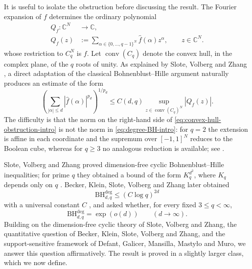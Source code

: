 \documentclass[11pt,a4paper]{article}
\numberwithin{equation}{section}
\theoremstyle{cleanplain}
\theoremstyle{cleandefinition}
\theoremstyle{cleanremark}
\newcommand{\C}{\mathbb C}
\newcommand{\BHdeg}[2]{\mathrm{BH}^{\mathrm{deg}}_{#1,#2}}
\begin{document}
It is useful to isolate the obstruction before discussing the result.  The
Fourier expansion of $f$ determines the ordinary polynomial
\begin{equation}\label{eq:ordinary-extension-intro}
 \begin{aligned}
 Q_f:\C^N&\longrightarrow\C,\\
 Q_f(z)&:=
 \sum_{\alpha\in\{0,\ldots,q-1\}^N}
 \widehat f(\alpha)z^\alpha,
 \qquad z\in\C^N.
 \end{aligned}
\end{equation}
whose restriction to $C_q^N$ is $f$.  Let
$\operatorname{conv}(C_q)$ denote the convex hull, in the complex plane, of
the $q$ roots of unity.  As explained by Slote, Volberg and Zhang
\cite[Section~2]{SVZ}, a direct adaptation of the classical
Bohnenblust--Hille argument naturally produces an estimate of the form
\begin{equation}\label{eq:convex-hull-obstruction-intro}
 \left(
 \sum_{|\alpha|\leq d}|\widehat f(\alpha)|^{p_d}
 \right)^{1/p_d}
 \leq C(d,q)
 \sup_{z\in\operatorname{conv}(C_q)^N}|Q_f(z)|.
\end{equation}
The difficulty is that the norm on the right-hand side of
\eqref{eq:convex-hull-obstruction-intro} is not the norm in
\eqref{eq:degree-BH-intro}: for $q=2$ the extension is affine in each
coordinate and the supremum over $[-1,1]^N$ reduces to the Boolean cube,
whereas for $q\geq3$ no analogous reduction is available; see
\cite[Section~2]{SVZ}.

Slote, Volberg and Zhang proved dimension-free cyclic
Bohnenblust--Hille inequalities; for prime $q$ they obtained a bound of the
form $K_q^{d^2}$, where $K_q$ depends only on $q$
\cite[Theorem~1]{SVZ}.  Becker, Klein, Slote,
Volberg and Zhang later obtained
\begin{equation}\label{eq:BKSVZ-intro-bound}
 \BHdeg{d}{q}\leq(C\log q)^{2d}
\end{equation}
with a universal constant $C$ \cite[Corollary~7]{BKSVZ}, and asked whether,
for every fixed $3\leq q<\infty$,
\begin{equation}\label{eq:BKSVZ-question-intro}
 \BHdeg{d}{q}=\exp(o(d))
 \qquad(d\to\infty).
\end{equation}
{\color{black}Building on the dimension-free cyclic theory of Slote, Volberg and Zhang,
the quantitative question of Becker, Klein, Slote, Volberg and Zhang, and the
support-sensitive framework of Defant, Galicer, Mansilla, Masty\l o and Muro,
we answer this question affirmatively.  The result is proved in a slightly
larger class, which we now define.}
\end{document}
